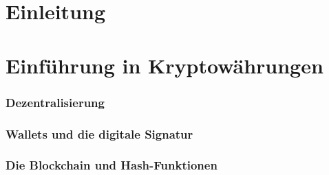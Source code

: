 \documentclass[12pt]{article}
\begin{document}
\renewcommand{\mytitle}{Entwicklung und Bewertung eines Kennzahlen-\\systems für nachhaltige Kryptowährungen}%
\renewcommand{\myauthor}{Michael Eing, Vanessa Kriebel,\\Timo Stovermann, Bastian Wynk}%
\renewcommand{\headheight}{27pt}%



\frontmatter%


\printabbreviations%
\clearpage
\renewcommand{\plaintitle}{Abbildungsverzeichnis}
{\def\makebox[#1][#2]#3{#3}%
\listoffigures
}
\clearpage
\renewcommand{\plaintitle}{Inhaltsverzeichnis}%
{\def\makebox[#1][#2]#3{#3}%
	\tableofcontents
}


\clearpage
\mainmatter%

\part{Einleitung}


\part{Einführung in Kryptowährungen}


\section{Dezentralisierung}


\section{Wallets und die digitale Signatur}


\section{Die Blockchain und Hash-Funktionen}

\end{document}
